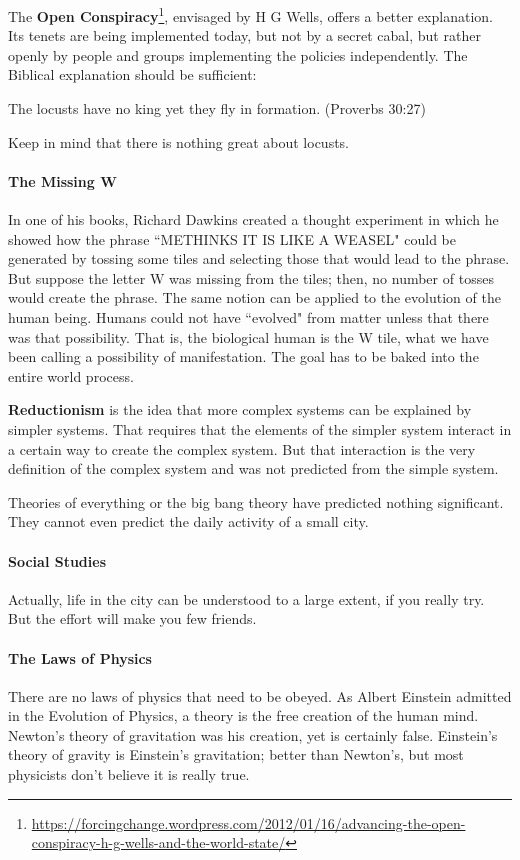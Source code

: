 The \textbf{Open Conspiracy}\footnote{\url{https://forcingchange.wordpress.com/2012/01/16/advancing-the-open-conspiracy-h-g-wells-and-the-world-state/}}, envisaged by H G Wells, offers a better explanation. Its tenets are being implemented today, but not by a secret cabal, but rather openly by people and groups implementing the policies independently. The Biblical explanation should be sufficient:

\begin{quotex}
The locusts have no king yet they fly in formation. (Proverbs 30:27) 

\end{quotex}
Keep in mind that there is nothing great about locusts.

\paragraph{The Missing W}
In one of his books, Richard Dawkins created a thought experiment in which he showed how the phrase ``METHINKS IT IS LIKE A WEASEL" could be generated by tossing some tiles and selecting those that would lead to the phrase. But suppose the letter W was missing from the tiles; then, no number of tosses would create the phrase. The same notion can be applied to the evolution of the human being. Humans could not have ``evolved" from matter unless that there was that possibility. That is, the biological human is the W tile, what we have been calling a possibility of manifestation. The goal has to be baked into the entire world process.

\textbf{Reductionism} is the idea that more complex systems can be explained by simpler systems. That requires that the elements of the simpler system interact in a certain way to create the complex system. But that interaction is the very definition of the complex system and was not predicted from the simple system.

Theories of everything or the big bang theory have predicted nothing significant. They cannot even predict the daily activity of a small city.

\paragraph{Social Studies}
Actually, life in the city can be understood to a large extent, if you really try. But the effort will make you few friends.

\paragraph{The Laws of Physics}
There are no laws of physics that need to be obeyed. As Albert Einstein admitted in the Evolution of Physics, a theory is the free creation of the human mind. Newton's theory of gravitation was his creation, yet is certainly false. Einstein's theory of gravity is Einstein's gravitation; better than Newton's, but most physicists don't believe it is really true.

